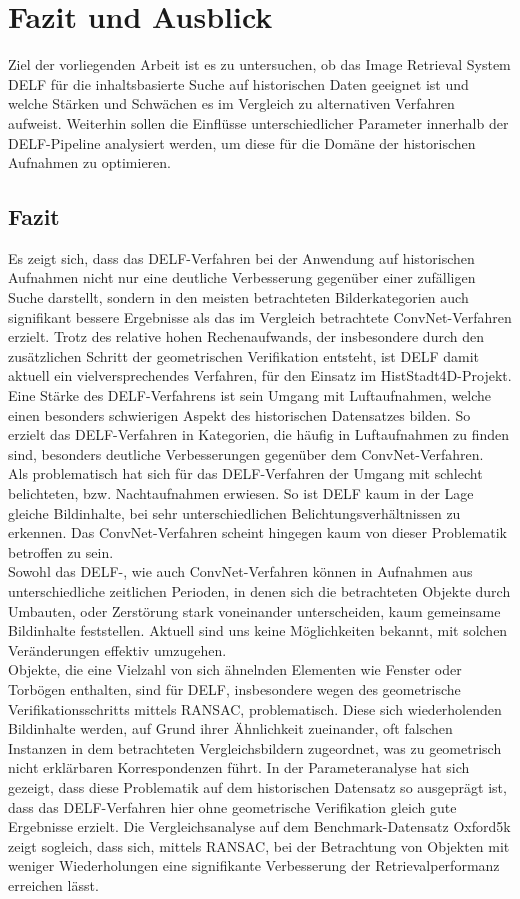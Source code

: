 \chapter{Fazit und Ausblick}

Ziel der vorliegenden Arbeit ist es zu untersuchen, ob das Image Retrieval System DELF für die inhaltsbasierte Suche auf historischen Daten geeignet ist und welche Stärken und Schwächen es im Vergleich zu alternativen Verfahren aufweist. Weiterhin sollen die Einflüsse unterschiedlicher Parameter innerhalb der DELF-Pipeline analysiert werden, um diese für die Domäne der historischen Aufnahmen zu optimieren.
\section{Fazit}
Es zeigt sich, dass das DELF-Verfahren bei der Anwendung auf historischen Aufnahmen nicht nur eine deutliche Verbesserung gegenüber einer zufälligen Suche darstellt, sondern in den meisten betrachteten Bilderkategorien auch signifikant bessere Ergebnisse als das im Vergleich betrachtete ConvNet-Verfahren erzielt. Trotz des relative hohen Rechenaufwands, der insbesondere durch den zusätzlichen Schritt der geometrischen Verifikation entsteht, ist DELF damit aktuell ein vielversprechendes Verfahren, für den Einsatz im HistStadt4D-Projekt.
\\
Eine Stärke des DELF-Verfahrens ist sein Umgang mit Luftaufnahmen, welche einen besonders schwierigen Aspekt des historischen Datensatzes bilden. So erzielt das DELF-Verfahren in Kategorien, die häufig in Luftaufnahmen zu finden sind, besonders deutliche Verbesserungen gegenüber dem ConvNet-Verfahren. 
\\
Als problematisch hat sich für das DELF-Verfahren der Umgang mit schlecht belichteten, bzw. Nachtaufnahmen erwiesen. So ist DELF kaum in der Lage gleiche Bildinhalte, bei sehr unterschiedlichen Belichtungsverhältnissen zu erkennen. Das ConvNet-Verfahren scheint hingegen kaum von dieser Problematik betroffen zu sein.
\\
Sowohl das DELF-, wie auch ConvNet-Verfahren können in Aufnahmen aus unterschiedliche zeitlichen Perioden, in denen sich die betrachteten Objekte durch Umbauten, oder Zerstörung stark voneinander unterscheiden, kaum gemeinsame Bildinhalte feststellen. Aktuell sind uns keine Möglichkeiten bekannt, mit solchen Veränderungen effektiv umzugehen.
\\
Objekte, die eine Vielzahl von sich ähnelnden Elementen wie Fenster oder Torbögen enthalten, sind für DELF, insbesondere wegen des geometrische Verifikationsschritts mittels RANSAC, problematisch. Diese sich wiederholenden Bildinhalte werden, auf Grund ihrer Ähnlichkeit zueinander, oft falschen Instanzen in dem betrachteten Vergleichsbildern zugeordnet, was zu geometrisch nicht erklärbaren Korrespondenzen führt. In der Parameteranalyse hat sich gezeigt, dass diese Problematik auf dem historischen Datensatz so ausgeprägt ist, dass das DELF-Verfahren hier ohne geometrische Verifikation gleich gute Ergebnisse erzielt. Die Vergleichsanalyse auf dem Benchmark-Datensatz Oxford5k zeigt sogleich, dass sich, mittels RANSAC, bei der Betrachtung von Objekten mit weniger Wiederholungen eine signifikante Verbesserung der Retrievalperformanz erreichen lässt. 
